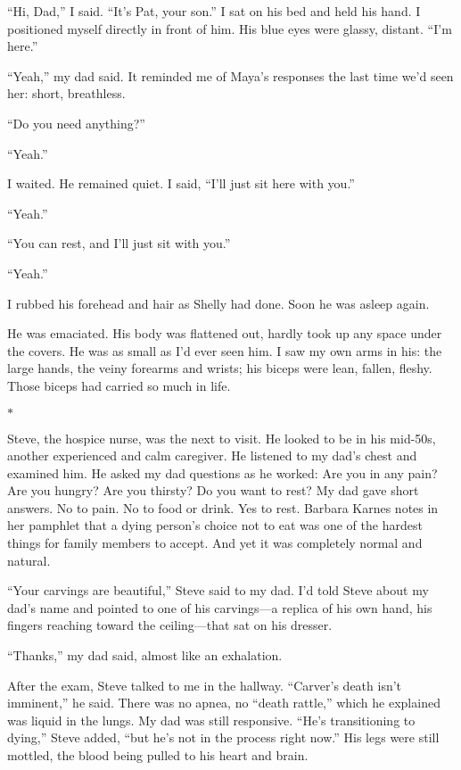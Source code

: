 \documentclass[12pt]{book}
\begin{document}
``Hi, Dad,'' I said. ``It's Pat, your son.'' I sat on his bed and held his hand. I positioned myself directly in front of him. His blue eyes were glassy, distant. ``I'm here.''

``Yeah,'' my dad said. It reminded me of Maya's responses the last time we'd seen her: short, breathless.

``Do you need anything?''

``Yeah.''

I waited. He remained quiet. I said, ``I'll just sit here with you.''

``Yeah.''

``You can rest, and I'll just sit with you.''

``Yeah.''

I rubbed his forehead and hair as Shelly had done. Soon he was asleep again.

He was emaciated. His body was flattened out, hardly took up any space under the covers. He was as small as I'd ever seen him. I saw my own arms in his: the large hands, the veiny forearms and wrists; his biceps were lean, fallen, fleshy. Those biceps had carried so much in life.

\begin{center}$*$\end{center}

Steve, the hospice nurse, was the next to visit. He looked to be in his mid-50s, another experienced and calm caregiver. He listened to my dad's chest and examined him. He asked my dad questions as he worked: Are you in any pain? Are you hungry? Are you thirsty? Do you want to rest? My dad gave short answers. No to pain. No to food or drink. Yes to rest. Barbara Karnes notes in her pamphlet that a dying person's choice not to eat was one of the hardest things for family members to accept. And yet it was completely normal and natural.

``Your carvings are beautiful,'' Steve said to my dad. I'd told Steve about my dad's name and pointed to one of his carvings---a replica of his own hand, his fingers reaching toward the ceiling---that sat on his dresser.

``Thanks,'' my dad said, almost like an exhalation.

After the exam, Steve talked to me in the hallway. ``Carver's death isn't imminent,'' he said. There was no apnea, no ``death rattle,'' which he explained was liquid in the lungs. My dad was still responsive. ``He's transitioning to dying,'' Steve added, ``but he's not in the process right now.'' His legs were still mottled, the blood being pulled to his heart and brain.
\end{document}
